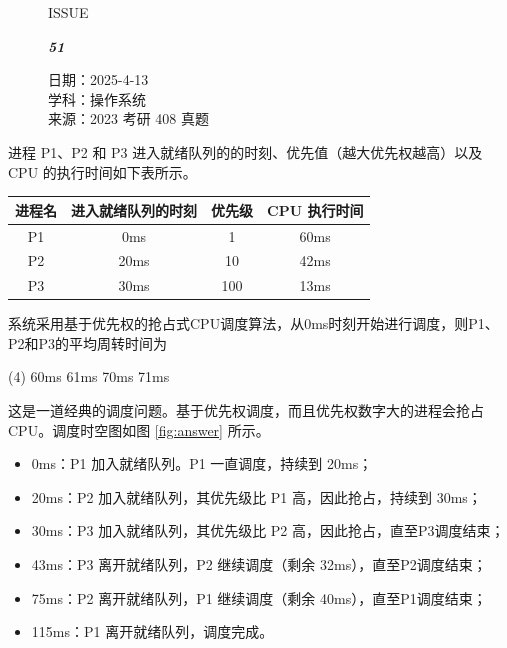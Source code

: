 \documentclass[UTF8]{ctexart}
\newcommand\Black[1]{\textcolor[gray]{0.3}{#1}}
\newcommand\Brown[1]{\textcolor[HTML]{998A4E}{#1}}
\newcommand\Emph[1]{\colorbox{green!10}{\textcolor{green!30!black}{#1}}}
\newcommand\IssueNumber{51}
\newcommand\Date{2025-4-13}
\newcommand\Subject{操作系统}
\newcommand\Source{2023 考研 408 真题}
\begin{document}
\begin{figure}[H]
\hspace{1cm}
\begin{minipage}[t]{0.3\textwidth}
\centering
    \Brown{\Genshin ISSUE}

    \vspace{-0.6cm}
    \Huge \Issue\slshape\bfseries\Black{\IssueNumber}
\end{minipage}
\hfill
\begin{minipage}[t]{0.35\textwidth}
\centering
    \Brown{日期：\Date} \\
\vspace{-0.1cm}
    \Brown{学科：\Subject} \\
\vspace{-0.1cm}
    \Brown{来源：\Source} \\
\end{minipage}
\hspace{0.8cm}
\end{figure}

{\color{darkcyan}
进程 P1、P2 和 P3 进入就绪队列的的时刻、优先值（越大优先权越高）以及 CPU 的执行时间如下表所示。

\begin{table}[htb]
    \color{darkcyan}
    \centering
    \begin{tabular}{cccc}
    \toprule
        进程名 & 进入就绪队列的时刻 & 优先级 & CPU 执行时间 \\
    \midrule
        P1 & 0ms & 1 & 60ms \\
        P2 & 20ms & 10 & 42ms \\
        P3 & 30ms & 100 & 13ms \\
    \bottomrule
    \end{tabular}
\end{table}

系统采用基于优先权的抢占式CPU调度算法，从0ms时刻开始进行调度，则P1、P2和P3的平均周转时间为

\begin{tasks}(4)
    \task 60ms
    \task 61ms
    \task 70ms
    \task 71ms
\end{tasks}
}

这是一道经典的调度问题。基于优先权调度，而且优先权数字大的进程会抢占CPU。调度时空图如图 \ref{fig:answer} 所示。

\begin{itemize}[itemsep=0pt,parsep=2pt]
    \item 0ms：P1 加入就绪队列。P1 一直调度，持续到 20ms；
    \item 20ms：P2 加入就绪队列，其优先级比 P1 高，因此\Emph{抢占}，持续到 30ms；
    \item 30ms：P3 加入就绪队列，其优先级比 P2 高，因此\Emph{抢占}，直至P3调度结束；
    \item 43ms：P3 离开就绪队列，P2 继续调度（剩余 32ms），直至P2调度结束；
    \item 75ms：P2 离开就绪队列，P1 继续调度（剩余 40ms），直至P1调度结束；
    \item 115ms：P1 离开就绪队列，调度完成。
\end{itemize}
\end{document}
